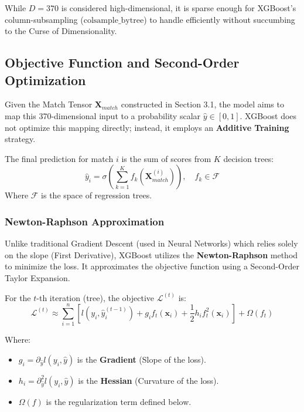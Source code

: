 \documentclass[12pt, a4paper]{article}
\begin{document}
    While $D=370$ is considered high-dimensional, it is sparse enough for XGBoost's column-subsampling ($\text{colsample\_bytree}$) to handle efficiently without succumbing to the Curse of Dimensionality.

    \subsection{Objective Function and Second-Order Optimization}

    Given the Match Tensor $\mathbf{X}_{match}$ constructed in Section 3.1, the model aims to map this 370-dimensional input to a probability scalar $\hat{y} \in [0,1]$. XGBoost does not optimize this mapping directly; instead, it employs an \textbf{Additive Training} strategy.

    The final prediction for match $i$ is the sum of scores from $K$ decision trees:
    \begin{equation}
        \hat{y}_i = \sigma \left( \sum_{k=1}^K f_k(\mathbf{X}_{match}^{(i)}) \right), \quad f_k \in \mathcal{F}
    \end{equation}
    Where $\mathcal{F}$ is the space of regression trees.

    \subsubsection{Newton-Raphson Approximation}
    Unlike traditional Gradient Descent (used in Neural Networks) which relies solely on the slope (First Derivative), XGBoost utilizes the \textbf{Newton-Raphson} method to minimize the loss. It approximates the objective function using a Second-Order Taylor Expansion.

    For the $t$-th iteration (tree), the objective $\mathcal{L}^{(t)}$ is:
    \begin{equation}
        \mathcal{L}^{(t)} \approx \sum_{i=1}^n \left[ l(y_i, \hat{y}_i^{(t-1)}) + g_i f_t(\mathbf{x}_i) + \frac{1}{2}h_i f_t^2(\mathbf{x}_i) \right] + \Omega(f_t)
    \end{equation}

    Where:
    \begin{itemize}
        \item $g_i = \partial_{\hat{y}} l(y_i, \hat{y})$ is the \textbf{Gradient} (Slope of the loss).
        \item $h_i = \partial^2_{\hat{y}} l(y_i, \hat{y})$ is the \textbf{Hessian} (Curvature of the loss).
        \item $\Omega(f)$ is the regularization term defined below.
    \end{itemize}
\end{document}
